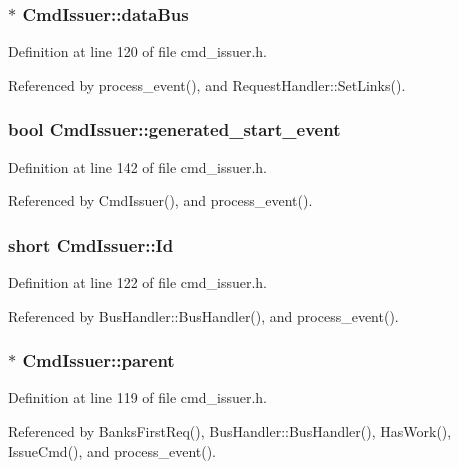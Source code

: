 \subsubsection[{dataBus}]{$\ast$ {\bf CmdIssuer::dataBus}}\label{classCmdIssuer_6f0d862a1a30aa215a5df5df54ffb274}




Definition at line 120 of file cmd\_\-issuer.h.

Referenced by process\_\-event(), and RequestHandler::SetLinks().
\subsubsection[{generated\_\-start\_\-event}]{\setlength{\rightskip}{0pt plus 5cm}bool {\bf CmdIssuer::generated\_\-start\_\-event}}\label{classCmdIssuer_e2dca7df5ab6300cd97bb7b90af25d25}




Definition at line 142 of file cmd\_\-issuer.h.

Referenced by CmdIssuer(), and process\_\-event().
\subsubsection[{Id}]{\setlength{\rightskip}{0pt plus 5cm}short {\bf CmdIssuer::Id}}\label{classCmdIssuer_cac87f00286cca7f0a03dce0542f6fde}




Definition at line 122 of file cmd\_\-issuer.h.

Referenced by BusHandler::BusHandler(), and process\_\-event().
\subsubsection[{parent}]{$\ast$ {\bf CmdIssuer::parent}}\label{classCmdIssuer_5e1ed2ce5508ea4bd898bbc6f46fd8ba}




Definition at line 119 of file cmd\_\-issuer.h.

Referenced by BanksFirstReq(), BusHandler::BusHandler(), HasWork(), IssueCmd(), and process\_\-event().
